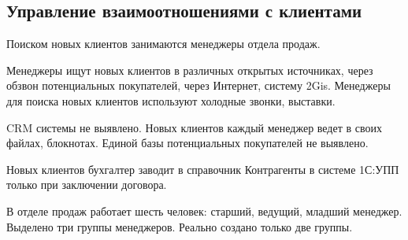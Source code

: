 %
\newpage

\subsection{Управление взаимоотношениями с клиентами}
\label{BP_CRM}

Поиском новых клиентов занимаются менеджеры отдела продаж.

Менеджеры ищут новых клиентов в различных открытых источниках, через обзвон потенциальных покупателей, через Интернет, систему 2Gis.
Менеджеры для поиска новых клиентов используют холодные звонки, выставки.


CRM системы не выявлено.
Новых клиентов каждый менеджер ведет в своих файлах, блокнотах. Единой базы потенциальных покупателей не выявлено.

Новых клиентов бухгалтер заводит в справочник Контрагенты в системе 1С:УПП только при заключении договора.


В отделе продаж работает шесть человек: старший, ведущий, младший менеджер.
Выделено три группы менеджеров. Реально создано только две группы.






